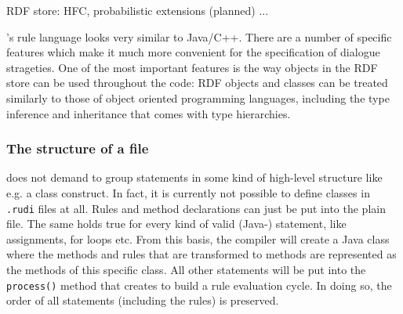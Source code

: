RDF store: HFC, probabilistic extensions (planned) ...
\fi

\vonda's rule language looks very similar to Java/C++. There are a number of
specific features which make it much more convenient for the specification of
dialogue strageties. One of the most important features is the way objects in
the RDF store can be used throughout the code: RDF objects and classes can be
treated similarly to those of object oriented programming languages, including
the type inference and inheritance that comes with type hierarchies.



\subsubsection{The structure of a \vonda file}

%
\vonda does not demand to group statements in some kind of high-level structure like e.g. a class construct. In fact, it is currently not possible to define classes in \texttt{.rudi} files at all. Rules and method declarations can just be put into the plain file. The same holds true for every kind of valid (Java-) statement, like assignments, for loops etc. From this basis, the compiler will create a Java class where the methods and rules that are transformed to methods are represented as the methods of this specific class. All other statements will be put into the \texttt{process()} method that \vonda creates to build a rule evaluation cycle. In doing so, the order of all statements (including the rules) is preserved.


